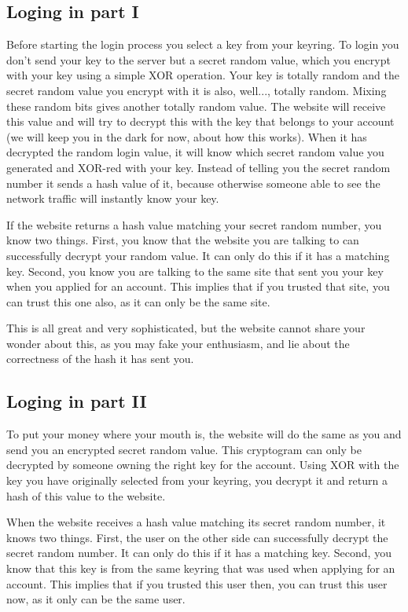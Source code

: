\subsection{Loging in part I}
Before starting the login process you select a key from your keyring.
To login you don't send your key to the server but a secret random value,
which you encrypt with your key using a simple XOR operation.
Your key is totally random and the secret random value you encrypt with it is also, well..., totally random.
Mixing these random bits gives another totally random value.
The website will receive this value and will try to decrypt this with the key that belongs to your account
(we will keep you in the dark for now, about how this works).
When it has decrypted the random login value, it will know which secret random value you generated and XOR-red with your key.
Instead of telling you the secret random number it sends a hash value of it,
because otherwise someone able to see the network traffic will instantly know your key.
\par
If the website returns a hash value matching your secret random number, you know two things.
First, you know that the website you are talking to can successfully decrypt your random value.
It can only do this if it has a matching key.
Second, you know you are talking to the same site that sent you your key when you applied for an account.
This implies that if you trusted that site, you can trust this one also, as it can only be the same site.
\par
This is all great and very sophisticated, but the website cannot share your wonder about this,
as you may fake your enthusiasm, and lie about the correctness of the hash it has sent you.
\subsection{Loging in part II}
To put your money where your mouth is,
the website will do the same as you and send you an encrypted secret random value.
This cryptogram can only be decrypted by someone owning the right key for the account.
Using XOR with the key you have originally selected from your keyring,
you decrypt it and return a hash of this value to the website.
\par
When the website receives a hash value matching its secret random number, it knows two things.
First, the user on the other side can successfully decrypt the secret random number.
It can only do this if it has a matching key.
Second, you know that this key is from the same keyring that was used when applying for an account.
This implies that if you trusted this user then, you can trust this user now, as it only can be the same user.
